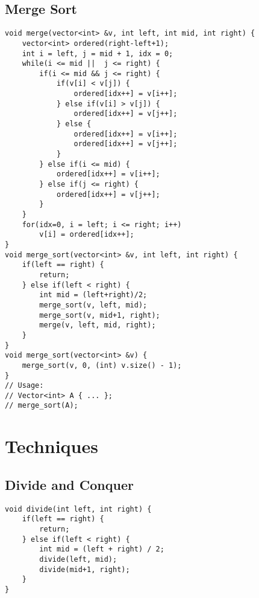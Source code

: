 \documentclass[10pt,letterpaper,twocolumn,twosided]{article}
\begin{document}
\subsection{Merge Sort}
\begin{lstlisting}
void merge(vector<int> &v, int left, int mid, int right) {
    vector<int> ordered(right-left+1);
    int i = left, j = mid + 1, idx = 0;
    while(i <= mid ||  j <= right) {
        if(i <= mid && j <= right) {
            if(v[i] < v[j]) {
                ordered[idx++] = v[i++];    
            } else if(v[i] > v[j]) {
                ordered[idx++] = v[j++];
            } else {
                ordered[idx++] = v[i++];
                ordered[idx++] = v[j++];
            }
        } else if(i <= mid) {
            ordered[idx++] = v[i++];
        } else if(j <= right) {
            ordered[idx++] = v[j++];
        }
    }
    for(idx=0, i = left; i <= right; i++)
        v[i] = ordered[idx++];
}
void merge_sort(vector<int> &v, int left, int right) {
    if(left == right) {
        return;
    } else if(left < right) {
        int mid = (left+right)/2;
        merge_sort(v, left, mid);
        merge_sort(v, mid+1, right);
        merge(v, left, mid, right);    
    }
}
void merge_sort(vector<int> &v) {
    merge_sort(v, 0, (int) v.size() - 1);
}
// Usage:
// Vector<int> A { ... };
// merge_sort(A);
\end{lstlisting}

\section{Techniques}

\subsection{Divide and Conquer}
\begin{lstlisting}
void divide(int left, int right) {
    if(left == right) {
        return;
    } else if(left < right) {
        int mid = (left + right) / 2;
        divide(left, mid);
        divide(mid+1, right);
    }
}
\end{lstlisting}
\end{document}
